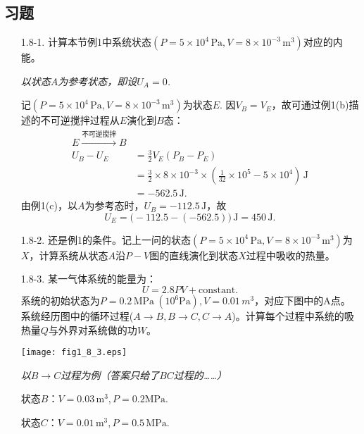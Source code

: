 \subsection*{习题}
\begin{enumerate}
	\item[1.8-1.]
		计算本节例1中系统状态$(P = 5 \times 10^4 \,\mathrm{Pa}, V = 8 \times 10^{-3}\, \mathrm{m}^3)$对应的内能。

		{\it
			以状态$A$为参考状态，即设$U_A = 0$.

			记$(P = 5 \times 10^4 \,\mathrm{Pa}, V = 8 \times 10^{-3}\, \mathrm{m}^3)$为状态$E$. 因$V_B = V_E$，故可通过例1(b)描述的不可逆搅拌过程从$E$演化到$B$态：
			\begin{align*}
				E \stackrel{{\text{不可逆搅拌}} }{\longrightarrow} B \\
				U_B - U_E &= \frac{3}{2} V_E (P_B - P_E) \\
				&= \frac{3}{2} \times 8 \times 10^{-3} \times \left( \frac{1}{32} \times 10^{5} - 5 \times 10^{4} \right) \,\mathrm{J} \\
				&= -562.5 \,\mathrm{J}.
			\end{align*}
			由例1(c)，以$A$为参考态时，$U_B = -112.5 \,\mathrm{J}$，故 
			\begin{equation*}
				U_E = \big(-112.5 - (-562.5) \big) \,\mathrm{J} = 450 \,\mathrm{J}.
			\end{equation*}
		}
	
	\item[1.8-2.]
		还是例1的条件。记上一问的状态$(P = 5\times 10^4 \,\mathrm{Pa}, V = 8 \times 10^{-3} \,\mathrm{m}^3)$为$X$，计算系统从状态$A$沿$P-V$图的直线演化到状态$X$过程中吸收的热量。

	\item[1.8-3.]
		某一气体系统的能量为：
		\[ U = 2.8 PV + \text{constant}. \]
		系统的初始状态为$P = 0.2\, \mathrm{MPa}\ (10^{6} \mathrm{Pa}), V = 0.01\, m^3$，对应下图中的A点。系统经历图中的循环过程($A \to B, B \to C, C \to A$)。计算每个过程中系统的吸热量$Q$与外界对系统做的功$W$。
		
		
		{
			\centering
			\texttt{[image: fig1\_8\_3.eps]}
			\notag
		}
		
		
		{\it
			以$B \to C$过程为例（答案只给了$BC$过程的……）
		
			状态$B$：$V = 0.03\, \mathrm{m}^3, P = 0.2 \mathrm{MPa}$.

			状态$C$：$V = 0.01 \,\mathrm{m}^3, P = 0.5 \,\mathrm{MPa}.$

}
\end{enumerate}
